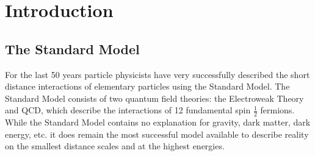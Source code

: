 \chapter{Introduction}

\section{The Standard Model}
\label{SM}
For the last 50 years particle physicists have very successfully described the short distance interactions of elementary particles using the Standard Model.  
The Standard Model consists of two quantum field theories: the Electroweak Theory and \gls{QCD}, which describe the interactions of 12 fundamental spin $\frac{1}{2}$ fermions.  
While the Standard Model contains no explanation for gravity, dark matter, dark energy, etc. it does remain the most successful model available to describe reality on the smallest distance scales and at the highest energies.  

